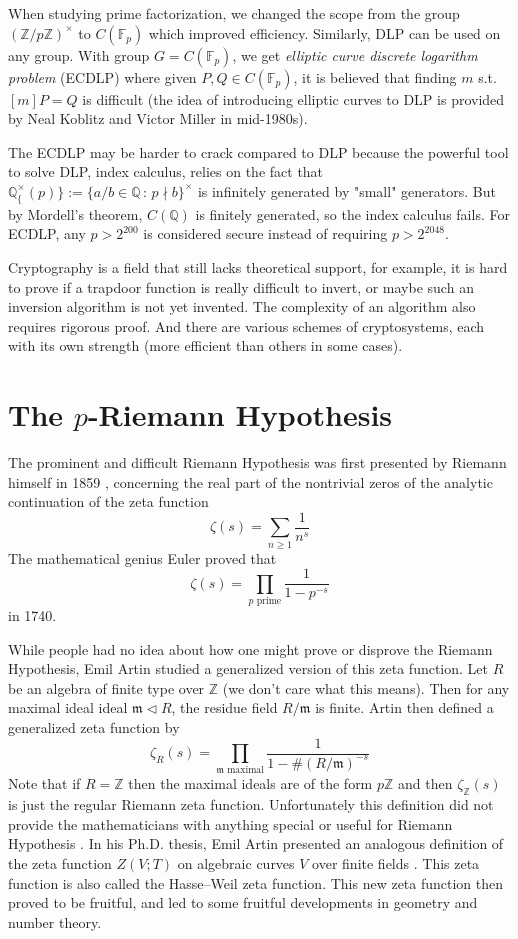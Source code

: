 \documentclass[12pt]{article}
\theoremstyle{remark}
\theoremstyle{definition}
\newcommand{\Z}[0]{\mathbb{Z}}
\newcommand{\F}[0]{\mathbb{F}}
\newcommand{\Q}[0]{\mathbb{Q}}
\begin{document}
    When studying prime factorization, we changed the scope from the group $(\Z/p\Z)^\times$ to $C(\F_p)$ which improved efficiency. Similarly, DLP can be used on any group. With group $G = C(\F_p)$, we get \textit{elliptic curve discrete logarithm problem} (ECDLP) where given $P, Q \in C(\F_p)$, it is believed that finding $m$ s.t. $[m]P = Q$ is difficult (the idea of introducing elliptic curves to DLP is provided by Neal Koblitz and Victor Miller in mid-1980s). 
    
    The ECDLP may be harder to crack compared to DLP because the powerful tool to solve DLP, index calculus, relies on the fact that $\Q^\times_\{(p)\} := \{a/b \in \Q \, : \, p \nmid b\}^\times$ is infinitely generated by "small" generators. But by Mordell's theorem, $C(\Q)$ is finitely generated, so the index calculus fails. For ECDLP,  any $p > 2^{200}$ is considered secure instead of requiring $p > 2^{2048}$.
    
    Cryptography is a field that still lacks theoretical support, for example, it is hard to prove if a trapdoor function is really difficult to invert, or maybe such an inversion algorithm is not yet invented. The complexity of an algorithm also requires rigorous proof. And there are various schemes of cryptosystems, each with its own strength (more efficient than others in some cases).
    
    
    \section{The $p$-Riemann Hypothesis}
        The prominent and difficult Riemann Hypothesis was first presented by Riemann himself in 1859 \cite{riemann_1859_ueber}, concerning the real part of the nontrivial zeros of the analytic continuation of the zeta function
        \[\zeta(s)=\sum_{n\geqslant 1}\frac{1}{n^s}\]
        The mathematical genius Euler proved that
        \[\zeta(s)=\prod_{p\text{ prime}}\frac{1}{1-p^{-s}}\]
        in 1740. 
        
        While people had no idea about how one might prove or disprove the Riemann Hypothesis, Emil Artin studied a generalized version of this zeta function. Let $R$ be an algebra of finite type over $\Z$ (we don't care what this means). Then for any maximal ideal ideal $\mathfrak m\lhd R$, the residue field $R/\mathfrak m$ is finite. Artin then defined a generalized zeta function by
        \[\zeta_R(s)=\prod_{\mathfrak m\text{ maximal}}\frac{1}{1-\#(R/\mathfrak m)^{-s}}\]
        Note that if $R=\Z$ then the maximal ideals are of the form $p\Z$ and then $\zeta_\Z(s)$ is just the regular Riemann zeta function. Unfortunately this definition did not provide the mathematicians with anything special or useful for Riemann Hypothesis \cite{oort_2014_wei}. In his Ph.D. thesis, Emil Artin presented an analogous definition of the zeta function $Z(V;T)$ on algebraic curves $V$ over finite fields \cite{Artin1924}. This zeta function is also called the Hasse–Weil zeta function. This new zeta function then proved to be fruitful, and led to some fruitful developments in geometry and number theory.
        
\end{document}
